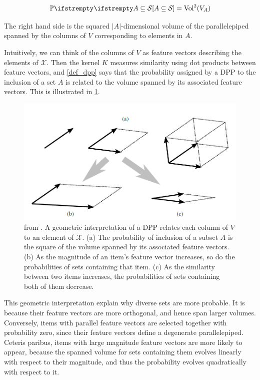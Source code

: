 \begin{equation}
    \PP{}{A \subseteq \mathcal{S}} = \operatorname{Vol}^2(V_A)
\end{equation}

The right hand side is the squared $|A|$-dimensional volume of the parallelepiped
spanned by the columns of $V$ corresponding to elements in $A$.

Intuitively, we can think of the columns of $V$ as feature vectors describing the elements
of $\mathcal{X}$. Then the kernel $K$ measures similarity using dot products between feature vectors, and \cref{def_dpp} says that the probability assigned by a DPP to the inclusion of a set $A$ is related to the volume spanned by its associated feature vectors. This is illustrated in \cref{fig_geometric_interpret}.

\begin{figure}[!ht]
    \centering
    \includegraphics[width=0.8\linewidth]{pics/geometric_interpret.png}
    \caption{from \cite{kulesza2012_dpp_for_ml}. A geometric interpretation of a DPP relates each column of $V$ to an element of $\mathcal{X}$. (a) The  probability of inclusion of a subset $A$ is the square of the volume spanned by its associated feature vectors. (b) As the magnitude of an item's feature vector increases, so do the probabilities of sets containing that item. (c) As the similarity between two items increases, the probabilities of sets containing both of them decrease.}
    \label{fig_geometric_interpret}
\end{figure}

This geometric interpretation explain why diverse sets are more probable. It is because their feature vectors are more orthogonal, and hence span larger volumes. Conversely, items with parallel feature vectors are selected together with probability zero, since their feature vectors define a degenerate parallelepiped. Ceteris paribus, items with large magnitude feature vectors are more likely to appear, because the spanned volume for sets containing them evolves linearly with respect to their magnitude, and thus the probability evolves quadratically with respect to it.








